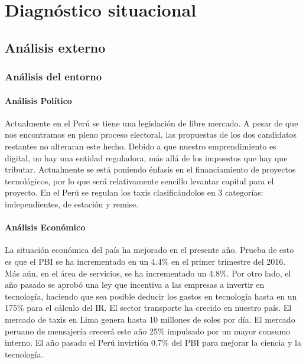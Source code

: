 \chapter{Diagnóstico situacional}

\section{Análisis externo}

\subsection{Análisis del entorno}
\subsubsection{Análisis Político}
Actualmente en el Perú se tiene una legislación de libre mercado. A pesar de que nos encontramos en pleno proceso electoral, las propuestas de los dos candidatos restantes no alteraran este hecho. Debido a que nuestro emprendimiento es digital, no hay una entidad reguladora, más allá de los impuestos que hay que tributar. Actualmente se está poniendo énfasis en el financiamiento de proyectos tecnológicos, por lo que será relativamente sencillo levantar capital para el proyecto.
En el Perú se regulan los taxis clasificándolos en 3 categorías: independientes, de estación y remise.

\subsubsection{Análisis Económico}
La situación económica del país ha mejorado en el presente año. Prueba de esto es que el PBI se ha incrementado en un 4.4\% en el primer trimestre del 2016. Más aún, en el área de servicios, se ha incrementado un 4.8\%. Por otro lado, el año pasado se aprobó una ley que incentiva a las empresas a invertir en tecnología, haciendo que sea posible deducir los gastos en tecnología hasta en un 175\% para el cálculo del IR.
El sector transporte ha crecido en nuestro país. El mercado de taxis en Lima genera hasta 10 millones de soles por día. El mercado peruano de mensajería crecerá este año 25\% impulsado por un mayor consumo interno. El año pasado el Perú invirtión 0.7\% del PBI para mejorar la ciencia y la tecnología.

